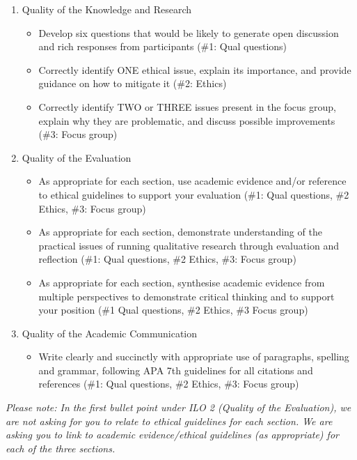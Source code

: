 \documentclass[
  english,
  letterpaper,
  DIV=11,
  numbers=noendperiod]{scrreprt}
\providecommand{\tightlist}{%
  \setlength{\itemsep}{0pt}\setlength{\parskip}{0pt}}
\begin{document}
\begin{enumerate}
\def\labelenumi{\arabic{enumi}.}
\item
  Quality of the Knowledge and Research

  \begin{itemize}
  \tightlist
  \item
    Develop six questions that would be likely to generate open
    discussion and rich responses from participants (\#1: Qual
    questions)
  \item
    Correctly identify ONE ethical issue, explain its importance, and
    provide guidance on how to mitigate it (\#2: Ethics)
  \item
    Correctly identify TWO or THREE issues present in the focus group,
    explain why they are problematic, and discuss possible improvements
    (\#3: Focus group)
  \end{itemize}
\item
  Quality of the Evaluation

  \begin{itemize}
  \tightlist
  \item
    As appropriate for each section, use academic evidence and/or
    reference to ethical guidelines to support your evaluation (\#1:
    Qual questions, \#2 Ethics, \#3: Focus group)
  \item
    As appropriate for each section, demonstrate understanding of the
    practical issues of running qualitative research through evaluation
    and reflection (\#1: Qual questions, \#2 Ethics, \#3: Focus group)
  \item
    As appropriate for each section, synthesise academic evidence from
    multiple perspectives to demonstrate critical thinking and to
    support your position (\#1 Qual questions, \#2 Ethics, \#3 Focus
    group)
  \end{itemize}
\item
  Quality of the Academic Communication

  \begin{itemize}
  \tightlist
  \item
    Write clearly and succinctly with appropriate use of paragraphs,
    spelling and grammar, following APA 7th guidelines for all citations
    and references (\#1: Qual questions, \#2 Ethics, \#3: Focus group)
  \end{itemize}
\end{enumerate}

\emph{Please note: In the first bullet point under ILO 2 (Quality of the
Evaluation), we are not asking for you to relate to ethical guidelines
for each section. We are asking you to link to academic evidence/ethical
guidelines (as appropriate) for each of the three sections.}
\end{document}
